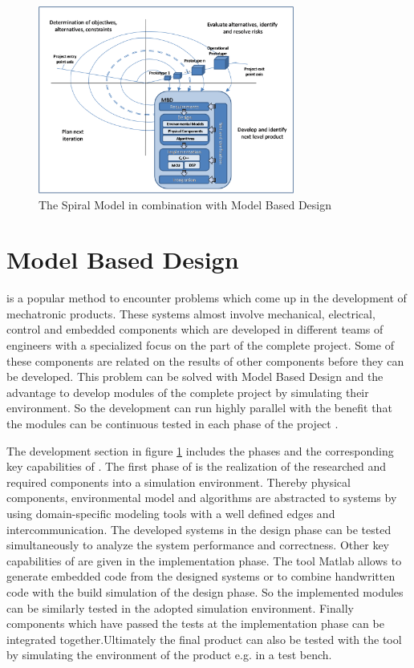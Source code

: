 \begin{figure}[!htbp]
	\centering
		\includegraphics[width=0.75\textwidth]{graphic/SpiralModelAndMBD.png}
\caption
{The Spiral Model in combination with Model Based Design}
	\label{fig:SpiralModelAndMBD}
\end{figure}

\newpage
\section{Model Based Design}

\MBD is a popular method to encounter problems which come up in the development
of mechatronic products. These systems almost involve mechanical, electrical, control
 and embedded components which are developed in different teams of
engineers with a specialized focus on the part of the complete project. Some of
these components are related on the results of other components before they can
be developed. This problem can be solved with Model Based Design and the
advantage to develop modules of the complete project by simulating their
environment. So the development can run highly parallel with the benefit that the
modules can be continuous tested in each phase of the project
.

The development section in figure \ref{fig:SpiralModelAndMBD} includes the phases
and the corresponding key capabilities of \MBD. The first phase of \MBD is the
realization of the researched and required components into a simulation
environment. Thereby physical components, environmental model and algorithms are
abstracted to systems by using domain-specific modeling tools with a well
defined edges and intercommunication. The developed systems in the design phase
can be tested simultaneously to analyze the system performance and correctness.
Other key capabilities of \MBD are given in the implementation phase. The \MBD
tool Matlab allows to generate embedded code from the designed systems or to
combine handwritten code with the build simulation of the design phase. So the
implemented modules can be similarly tested in the adopted simulation
environment. Finally components which have passed the tests at the implementation
phase can be integrated together.\newpage Ultimately the final product can also be tested
with the \MBD tool by simulating the environment of the product e.g. in a \HIL
test bench. 

